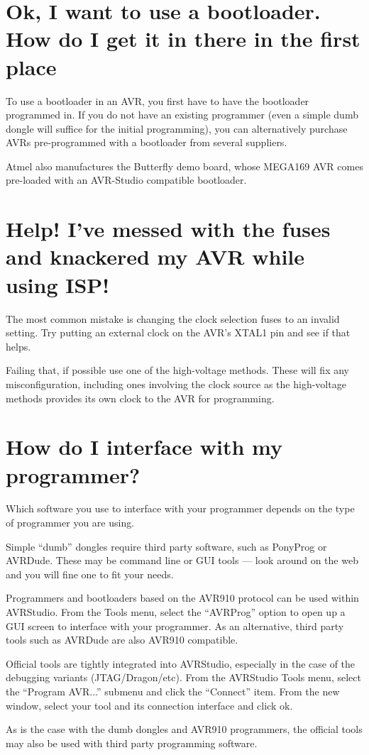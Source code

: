 \documentclass[a4paper,oneside,notitlepage]{book}
\begin{document}
\section{Ok, I want to use a bootloader. How do I get it in there in the first place\textinterrobang}
To use a bootloader in an AVR, you first have to have the bootloader programmed in. If you do not have an existing programmer (even a simple dumb dongle will suffice for the initial programming), you can alternatively purchase AVRs pre-programmed with a bootloader from several suppliers.

Atmel also manufactures the Butterfly demo board, whose MEGA169 AVR comes pre-loaded with an AVR-Studio compatible bootloader.

\section{Help! I've messed with the fuses and knackered my AVR while using ISP!}
The most common mistake is changing the clock selection fuses to an invalid setting. Try putting an external clock on the AVR's XTAL1 pin and see if that helps.

Failing that, if possible use one of the high-voltage methods. These will fix any misconfiguration, including ones involving the clock source as the high-voltage methods provides its own clock to the AVR for programming.

\section{How do I interface with my programmer?}
Which software you use to interface with your programmer depends on the type of programmer you are using.

Simple ``dumb'' dongles require third party software, such as PonyProg or AVRDude. These may be command line or GUI tools --- look around on the web and you will fine one to fit your needs.

Programmers and bootloaders based on the AVR910 protocol can be used within AVRStudio. From the Tools menu, select the ``AVRProg'' option to open up a GUI screen to interface with your programmer. As an alternative, third party tools such as AVRDude are also AVR910 compatible.

Official tools are tightly integrated into AVRStudio, especially in the case of the debugging variants (JTAG/Dragon/etc). From the AVRStudio Tools menu, select the ``Program AVR...'' submenu and click the ``Connect'' item. From the new window, select your tool and its connection interface and click ok.

As is the case with the dumb dongles and AVR910 programmers, the official tools may also be used with third party programming software.
\end{document}
